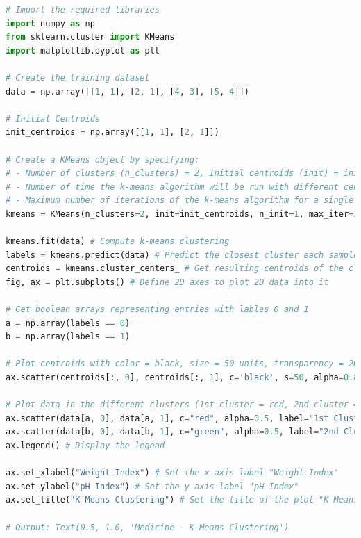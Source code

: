 \documentclass{book}
\begin{document}
\begin{lstlisting}[language=Python, basicstyle=\ttfamily\small, keywordstyle=\color{blue}, commentstyle=\color{forestgreen}, stringstyle=\color{red}, showstringspaces=false]
# Import the required libraries
import numpy as np
from sklearn.cluster import KMeans
import matplotlib.pyplot as plt

# Create the training dataset
data = np.array([[1, 1], [2, 1], [4, 3], [5, 4]])

# Initial Centroids
init_centroids = np.array([[1, 1], [2, 1]])

# Create a KMeans object by specifying:
# - Number of clusters (n_clusters) = 2, Initial centroids (init) = init_centroids
# - Number of time the k-means algorithm will be run with different centroid seeds (n_init) = 1
# - Maximum number of iterations of the k-means algorithm for a single run (max_iter) = 3
kmeans = KMeans(n_clusters=2, init=init_centroids, n_init=1, max_iter=3)

kmeans.fit(data) # Compute k-means clustering
labels = kmeans.predict(data) # Predict the closest cluster each sample in data belongs to
centroids = kmeans.cluster_centers_ # Get resulting centroids of the clusters
fig, ax = plt.subplots() # Define 2D axes to plot 2D data into it

# Get boolean arrays representing entries with lables 0 and 1
a = np.array(labels == 0)
b = np.array(labels == 1)

# Plot centroids with color = black, size = 50 units, transparency = 20% and put label "Centroids"
ax.scatter(centroids[:, 0], centroids[:, 1], c='black', s=50, alpha=0.8, label="Centroids")

# Plot data in the different clusters (1st cluster = red, 2nd cluster = green) with transparency = 50%
ax.scatter(data[a, 0], data[a, 1], c="red", alpha=0.5, label="1st Cluster")
ax.scatter(data[b, 0], data[b, 1], c="green", alpha=0.5, label="2nd Cluster")
ax.legend() # Display the legend

ax.set_xlabel("Weight Index") # Set the x-axis label "Weight Index"
ax.set_ylabel("pH Index") # Set the y-axis label "pH Index"
ax.set_title("K-Means Clustering") # Set the title of the plot "K-Means Clustering"

# Output: Text(0.5, 1.0, 'Medicine - K-Means Clustering')
\end{lstlisting}
\end{document}
